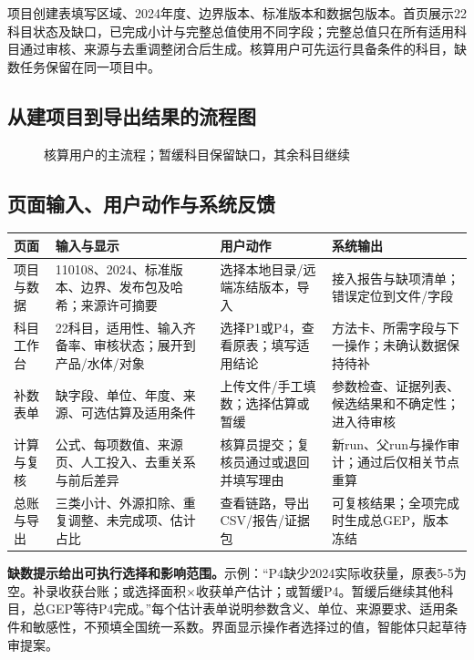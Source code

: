 \documentclass[12pt,a4paper,fontset=fandol]{ctexart}
\begin{document}
项目创建表填写区域、2024年度、边界版本、标准版本和数据包版本。首页展示22科目状态及缺口，已完成小计与完整总值使用不同字段；完整总值只在所有适用科目通过审核、来源与去重调整闭合后生成。核算用户可先运行具备条件的科目，缺数任务保留在同一项目中。

\subsection{从建项目到导出结果的流程图}
\begin{figure}[H]\centering
{}
\caption{核算用户的主流程；暂缓科目保留缺口，其余科目继续}
\end{figure}

\subsection{页面输入、用户动作与系统反馈}
\begin{longtable}{P{2cm}P{4.2cm}P{3.9cm}P{2.9cm}}
\toprule 页面 & 输入与显示 & 用户动作 & 系统输出 \\\midrule\endhead
项目与数据 & 110108、2024、标准版本、边界、发布包及哈希；来源许可摘要 & 选择本地目录/远端冻结版本，导入 & 接入报告与缺项清单；错误定位到文件/字段 \\
科目工作台 & 22科目，适用性、输入齐备率、审核状态；展开到产品/水体/对象 & 选择P1或P4，查看原表；填写适用结论 & 方法卡、所需字段与下一操作；未确认数据保持待补 \\
补数表单 & 缺字段、单位、年度、来源、可选估算及适用条件 & 上传文件/手工填数；选择估算或暂缓 & 参数检查、证据列表、候选结果和不确定性；进入待审核 \\
计算与复核 & 公式、每项数值、来源页、人工投入、去重关系与前后差异 & 核算员提交；复核员通过或退回并填写理由 & 新run、父run与操作审计；通过后仅相关节点重算 \\
总账与导出 & 三类小计、外源扣除、重复调整、未完成项、估计占比 & 查看链路，导出CSV/报告/证据包 & 可复核结果；全项完成时生成总GEP，版本冻结 \\
\bottomrule
\end{longtable}
\textbf{缺数提示给出可执行选择和影响范围。}示例：“P4缺少2024实际收获量，原表5-5为空。补录收获台账；或选择面积×收获单产估计；或暂缓P4。暂缓后继续其他科目，总GEP等待P4完成。”每个估计表单说明参数含义、单位、来源要求、适用条件和敏感性，不预填全国统一系数。界面显示操作者选择过的值，智能体只起草待审提案。
\end{document}

